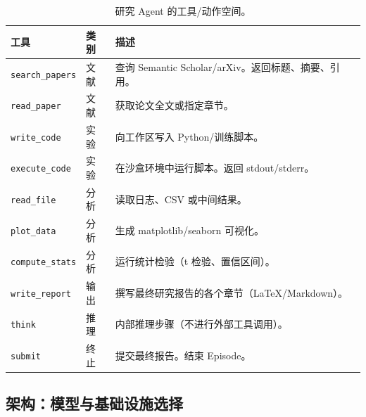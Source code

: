 \begin{table}[ht!]
\centering\small
\caption{研究 Agent 的工具/动作空间。}
\noindent\begin{tabularx}{\linewidth}{@{}l Z{0.3} Z{1.7}@{}}
\toprule
\textbf{工具} & \textbf{类别} & \textbf{描述} \\
\midrule
\texttt{search\_papers} & 文献 & 查询 Semantic Scholar/arXiv。返回标题、摘要、引用。 \\
\texttt{read\_paper} & 文献 & 获取论文全文或指定章节。 \\
\texttt{write\_code} & 实验 & 向工作区写入 Python/训练脚本。 \\
\texttt{execute\_code} & 实验 & 在沙盒环境中运行脚本。返回 stdout/stderr。 \\
\texttt{read\_file} & 分析 & 读取日志、CSV 或中间结果。 \\
\texttt{plot\_data} & 分析 & 生成 matplotlib/seaborn 可视化。 \\
\texttt{compute\_stats} & 分析 & 运行统计检验（t 检验、置信区间）。 \\
\texttt{write\_report} & 输出 & 撰写最终研究报告的各个章节（LaTeX/Markdown）。 \\
\texttt{think} & 推理 & 内部推理步骤（不进行外部工具调用）。 \\
\texttt{submit} & 终止 & 提交最终报告。结束 Episode。 \\
\bottomrule
\end{tabularx}
\end{table}

\subsection{架构：模型与基础设施选择}
\label{architecture-model-and-infrastructure-choices}

